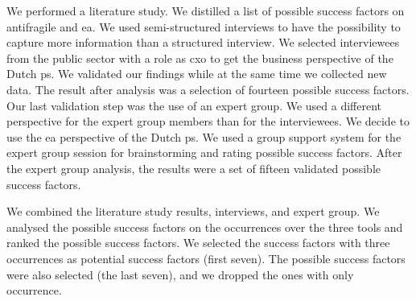 We performed a literature study. We distilled a list of possible success factors on \gls{antifragile} and \gls{ea}.  We used semi-structured interviews to have the possibility to capture more information than a structured interview. We selected interviewees from the public sector with a role as \gls{cxo} to get the business perspective of the Dutch \gls{ps}. We validated our findings while at the same time we collected new data. The result after analysis was a selection of fourteen possible success factors. Our last validation step was the use of an expert group. We used a different perspective for the expert group members than for the interviewees. We decide to use the \gls{ea} perspective of the Dutch \gls{ps}. We used a group support system for the expert group session for brainstorming and rating possible success factors. After the expert group analysis, the results were a set of fifteen validated possible success factors.

We combined the literature study results, interviews, and expert group. We analysed the possible success factors on the occurrences over the three tools and ranked the possible success factors. We selected the success factors with three occurrences as potential success factors (first seven). The possible success factors were also selected (the last seven), and we dropped the ones with only occurrence.

